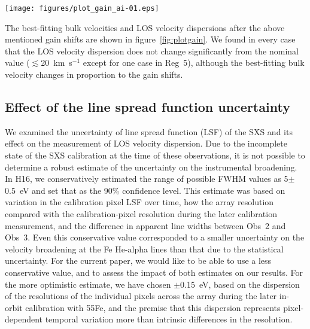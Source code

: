 \begin{figure*}
 \begin{center}
 \texttt{[image: figures/plot\_gain\_ai-01.eps]} 
 \end{center}
 \caption{The best-fitting bulk velocities and LOS velocity dispersions after manually shifting the energy gain. {\it Top:} the effect of the uncertainty of Obs~1 gain relative to Obs~3 and Obs~4. {\it Middle:} the effect of the pixel-to-pixel gain uncertainty within Obs~1. {\it Bottom:} the effect of the pixel-to-pixel gain uncertainties within Obs~3 and Obs~4. The red crosses are the best-fitting values shown in table~\ref{tab:velocity}, and the grey crosses and dashed lines represent the best-fitting values after the gain shifts.}
\label{fig:plotgain}
\end{figure*}

The best-fitting bulk velocities and LOS velocity dispersions after the above mentioned gain shifts are shown in figure~\ref{fig:plotgain}. We found in every case that the LOS velocity dispersion does not change significantly from the nominal value ($\lesssim$20~km~s$^{-1}$ except for one case in Reg~5), although the best-fitting bulk velocity changes in proportion to the gain shifts.

\subsection{Effect of the line spread function uncertainty}
\label{sec:lsf}

We examined the uncertainty of line spread function (LSF) of the SXS and its effect on the measurement of LOS velocity dispersion. Due to the incomplete state of the SXS calibration at the time of these observations, it is not possible to determine a robust estimate of the uncertainty on the instrumental broadening. In H16, we conservatively estimated the range of possible FWHM values as 5$\pm$0.5~eV and set that as the 90\% confidence level. This estimate was based on variation in the calibration pixel LSF over time, how the array resolution compared with the calibration-pixel resolution during the later calibration measurement, and the difference in apparent line widths between Obs~2 and Obs~3. Even this conservative value corresponded to a smaller uncertainty on the velocity broadening at the Fe He-alpha lines than that due to the statistical uncertainty. For the current paper, we would like to be able to use a less conservative value, and to assess the impact of both estimates on our results. For the more optimistic estimate, we have chosen $\pm$0.15~eV, based on the dispersion of the resolutions of the individual pixels across the array during the later in-orbit calibration with 55Fe, and the premise that this dispersion represents pixel-dependent temporal variation more than intrinsic differences in the resolution.


